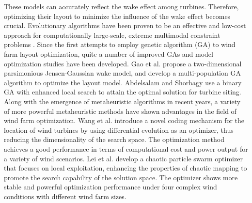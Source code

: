 \documentclass[journal,twoside]{IEEEtran}
\begin{document}
    These models can accurately reflect the wake effect among turbines. Therefore, optimizing their layout to minimize the influence of the wake effect becomes crucial. Evolutionary algorithms have been proven to be an effective and low-cost approach for computationally large-scale, extreme multimodal constraint problems \cite{miikkulainen2021biological,tang2021review}. Since the first attempts to employ genetic algorithm (GA) \cite{mosetti1994optimization} to wind farm layout optimization, quite a number of improved GAs and model optimization studies have been developed. Gao et al. \cite{gao2016optimization} propose a two-dimensional parsimonious Jensen-Gaussian wake model, and develop a multi-population GA algorithm to optimize the layout model. Abdelsalam and Shorbagy \cite{abdelsalam2018optimization} use a binary GA with enhanced local search to attain the optimal solution for turbine siting. Along with the emergence of metaheuristic algorithms in recent years, a variety of more powerful metaheuristic methods have shown advantages in the field of wind farm optimization. Wang et al.\cite{wang2017differential} introduce a novel coding mechanism for the location of wind turbines by using differential evolution as an optimizer, thus reducing the dimensionality of the search space. The optimization method achieves a good performance in terms of computational cost and power output for a variety of wind scenarios. Lei et al.\cite{lei2023chaotic} develop a chaotic particle swarm optimizer that focuses on local exploitation, enhancing the properties of chaotic mapping to promote the search capability of the solution space. The optimizer shows more stable and powerful optimization performance under four complex wind conditions with different wind farm sizes.
    
\end{document}
